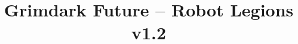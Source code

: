 \documentclass[10pt]{article}
\title{Grimdark Future – Robot Legions v1.2}
\begin{document}
\maketitle

\UnitTable{}

\begin{multicols*}{3}[]
	\begin{center}


	\end{center}
\end{multicols*}
\end{document}
